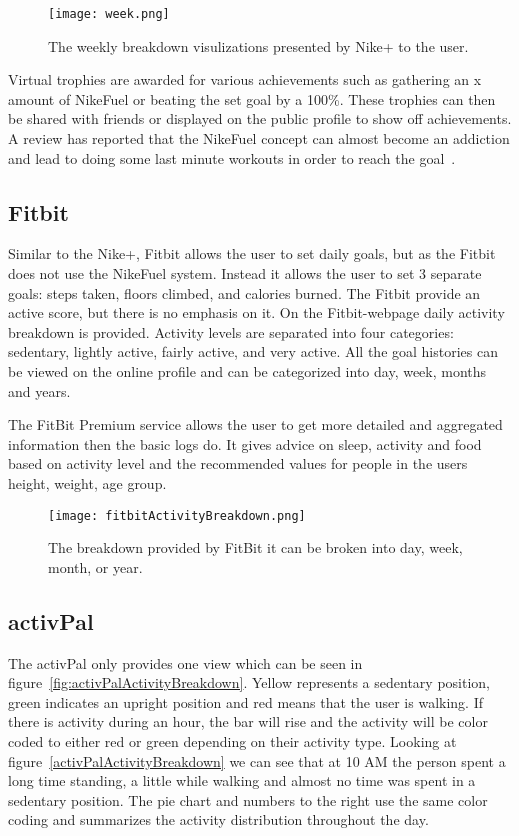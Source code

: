 \begin{figure}[h!]
	\centering
		\texttt{[image: week.png]}
		\caption{\footnotesize The weekly breakdown visulizations presented by Nike+ to the user. \cite{fuelbandTechSpce}}
		\label{fig:activityBreakdown}
\end{figure}

Virtual trophies are awarded for various achievements such as gathering an x amount of NikeFuel or beating the set goal by a 100\%. These trophies can then be shared with friends or displayed on the public profile to show off achievements. A review has reported that the NikeFuel concept can almost become an addiction and lead to doing some last minute workouts in order to reach the goal~\cite{fuelbandDcRain}.

\subsection{Fitbit}
Similar to the Nike+, Fitbit \cite{fitBit} allows the user to set daily goals, but as the Fitbit does not use the NikeFuel system. Instead it allows the user to set 3 separate goals: steps taken, floors climbed, and calories burned. The Fitbit provide an active score, but there is no emphasis on it. On the Fitbit-webpage daily activity breakdown is provided. Activity levels are separated into four categories: sedentary, lightly active, fairly active, and very active. All the goal histories can be viewed on the online profile and can be categorized into day, week, months and years. 

The FitBit Premium service allows the user to get more detailed and aggregated information then the basic logs do. It gives advice on sleep, activity and food based on activity level and the recommended values for people in the users height, weight, age group.

\begin{figure}[h!]
	\centering
		\texttt{[image: fitbitActivityBreakdown.png]}
		\caption{\footnotesize The breakdown provided by FitBit it can be broken into day, week, month, or year.}
		\label{fig:fitbitActivityBreakdown}
\end{figure}

\subsection{activPal}
The activPal only provides one view which can be seen in figure~\ref{fig:activPalActivityBreakdown}. Yellow represents a sedentary position, green indicates an upright position and red means that the user is walking. If there is activity during an hour, the bar will rise and the activity will be color coded to either red or green depending on their activity type. Looking at figure~\ref{activPalActivityBreakdown} we can see that at 10 AM the person spent a long time standing, a little while walking and almost no time was spent in a sedentary position. The pie chart and numbers to the right use the same color coding and summarizes the activity distribution throughout the day.

